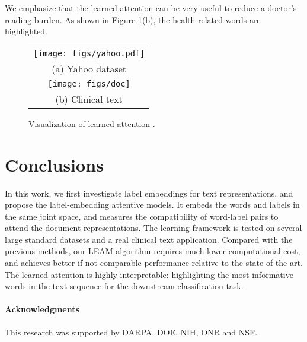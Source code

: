 \documentclass[11pt,a4paper]{article}
\begin{document}
We emphasize that the learned attention can be very useful to reduce a doctor's reading burden. As shown in Figure \ref{fig:attention}(b), the health related words are highlighted.


\begin{figure}[t!] \centering
	\vspace{-0mm}
	\begin{tabular}{c}		
		\hspace{-5mm}
		\texttt{[image: figs/yahoo.pdf]} \\
		(a) Yahoo dataset  \vspace{0mm}  \\
		\hspace{-5mm}
		\texttt{[image: figs/doc]}   \\
		(b) Clinical text  \hspace{-0mm}
	\end{tabular}
	\vspace{-1mm}
	\caption{Visualization of learned attention .}
	\vspace{-0mm}
	\label{fig:attention}
\end{figure}


\section{Conclusions}
\label{sec:conclusions}
In this work, we first investigate label embeddings for text representations, 
and propose the label-embedding attentive models. It embeds the words and labels in the same joint space, and measures the compatibility of word-label pairs to attend the document representations.
The learning framework is tested on several large standard datasets and a real clinical text application. Compared with the previous methods, our LEAM algorithm requires much lower computational cost, and achieves better if not comparable performance relative to the state-of-the-art. The learned attention is highly interpretable: highlighting the most informative words in the text sequence for the downstream classification task.

\paragraph{Acknowledgments} This research was supported by DARPA, DOE, NIH, ONR and NSF.



\newpage


\end{document}
